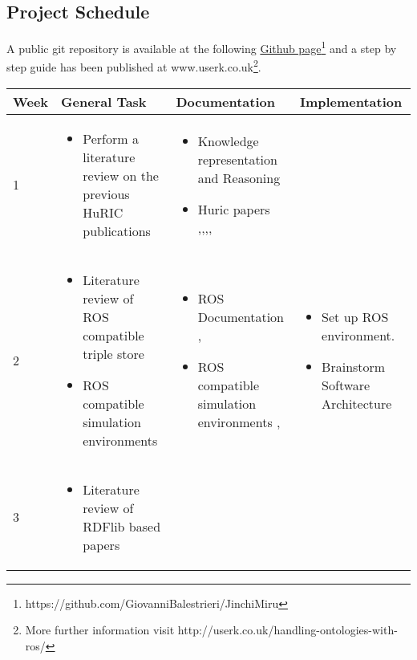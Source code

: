 \subsection{Project Schedule}
A public git repository is available at the following \href{https://github.com/GiovanniBalestrieri/JinchiMiru}{Github page}\footnote{https://github.com/GiovanniBalestrieri/JinchiMiru} and a step by step guide has been published at www.userk.co.uk\footnote{More further information visit http://userk.co.uk/handling-ontologies-with-ros/}.
\small
\noindent 
\begin{center}
    \begin{tabular}{ | l | p{4cm} | p{4cm} | p{5cm} |}
    \hline
    Week & General Task & Documentation & Implementation \\ \hline
    1 &  \begin{itemize} 
    \item Perform a literature review on the previous HuRIC
     publications
     \end{itemize} & 
	\begin{itemize}
     \item  Knowledge representation and Reasoning \cite{bib11}
     \item  Huric papers
      \cite{bib1},\cite{bib2},\cite{bib3},\cite{bib4}, \cite{bib5}
	\end{itemize} & \\ \hline
    2 & \begin{itemize}
     \item Literature review of ROS compatible triple store
     \item ROS compatible simulation environments
	\end{itemize}     
     & \begin{itemize}
     \item ROS Documentation \cite{bib6}, \cite{bib7}
     \item ROS compatible simulation environments \cite{bib8}, \cite{bib9}
	\end{itemize}   & 
	\begin{itemize} 
	\item Set up ROS environment.
	\item Brainstorm Software Architecture
	\end{itemize}\\ \hline
    3 & \begin{itemize}
     \item Literature review of RDFlib based papers

\end{itemize}
\end{tabular}
\end{center}
